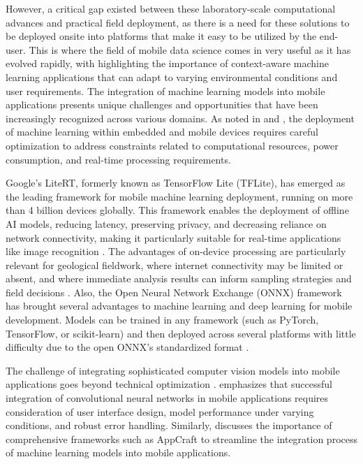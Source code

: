 \documentclass[final-report]{report-template}
\begin{document}
However, a critical gap existed between these laboratory-scale computational advances and practical field deployment, as there is a need for these solutions to be deployed onsite into platforms that make it easy to be utilized by the end-user. This is where the field of mobile data science comes in very useful as it has evolved rapidly, with \cite{Iqbal2020, Iqbal2021} highlighting the importance of context-aware machine learning applications that can adapt to varying environmental conditions and user requirements. The integration of machine learning models into mobile applications presents unique challenges and opportunities that have been increasingly recognized across various domains. As noted in \cite{Ajani2021} and \cite{Lane2017}, the deployment of machine learning within embedded and mobile devices requires careful optimization to address constraints related to computational resources, power consumption, and real-time processing requirements. 

Google's LiteRT, formerly known as TensorFlow Lite (TFLite), has emerged as the leading framework for mobile machine learning deployment, running on more than 4 billion devices globally. This framework enables the deployment of offline AI models, reducing latency, preserving privacy, and decreasing reliance on network connectivity, making it particularly suitable for real-time applications like image recognition \citep{Channonthawat2016}. The advantages of on-device processing are particularly relevant for geological fieldwork, where internet connectivity may be limited or absent, and where immediate analysis results can inform sampling strategies and field decisions \citep{Veeramani2022, Dai2020}. Also, the Open Neural Network Exchange (ONNX) framework has brought several advantages to machine learning and deep learning for mobile development. Models can be trained in any framework (such as PyTorch, TensorFlow, or scikit-learn) and then deployed across several platforms with little difficulty due to the open ONNX's standardized format \citep{joshua2025cross}.

The challenge of integrating sophisticated computer vision models into mobile applications goes beyond technical optimization \cite{Arpteg2018}. \cite{Roger2021} emphasizes that successful integration of convolutional neural networks in mobile applications requires consideration of user interface design, model performance under varying conditions, and robust error handling. Similarly, \cite{Lyan2023} discusses the importance of comprehensive frameworks such as AppCraft to streamline the integration process of machine learning models into mobile applications.
\end{document}
